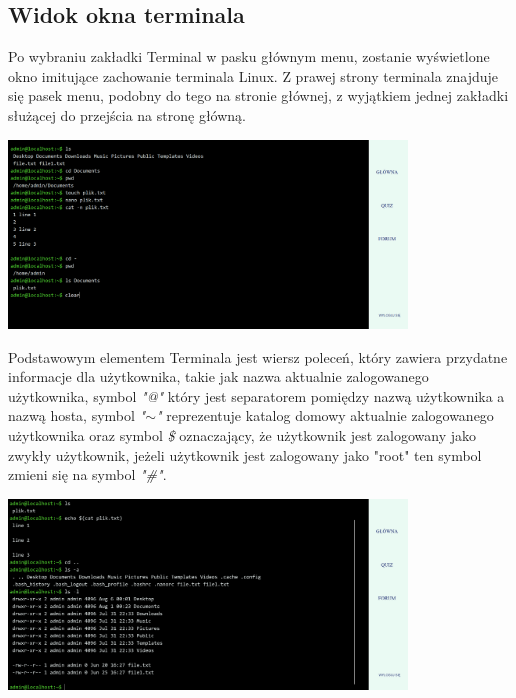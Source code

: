 \documentclass[10pt,a4paper]{report}
\begin{document}
\begin{adjustwidth}{2cm}{2cm}
\subsection{Widok okna terminala}
\begin{minipage}{1\linewidth}
Po wybraniu zakładki Terminal w pasku głównym menu, zostanie wyświetlone okno imitujące zachowanie terminala Linux.
Z prawej strony terminala znajduje się pasek menu, podobny do tego na stronie głównej, z wyjątkiem jednej zakładki służącej do przejścia na stronę główną. \\
\end{minipage}
\begin{minipage}{\linewidth}
\begin{center}
  \includegraphics[width=400px]{project/term1.png}
\end{center}
\end{minipage}
\begin{minipage}{1\linewidth}
\vspace{0.3cm}
 Podstawowym elementem Terminala jest wiersz poleceń, który zawiera przydatne informacje dla użytkownika, takie jak nazwa aktualnie zalogowanego użytkownika, symbol \textit{"@"} który jest separatorem pomiędzy nazwą użytkownika a nazwą hosta, symbol \textit{"$\sim$"} reprezentuje katalog domowy aktualnie zalogowanego użytkownika oraz symbol \textit{\$} oznaczający, że użytkownik jest zalogowany  jako zwykły użytkownik, jeżeli użytkownik jest zalogowany jako "root" ten 
 symbol zmieni się na symbol \textit{"\#"}. \\
  \end{minipage}
  \begin{minipage}{\linewidth}
\begin{center}
  \includegraphics[width=400px]{project/term2.png}

\end{center}
\end{minipage}
\end{adjustwidth}
\end{document}
